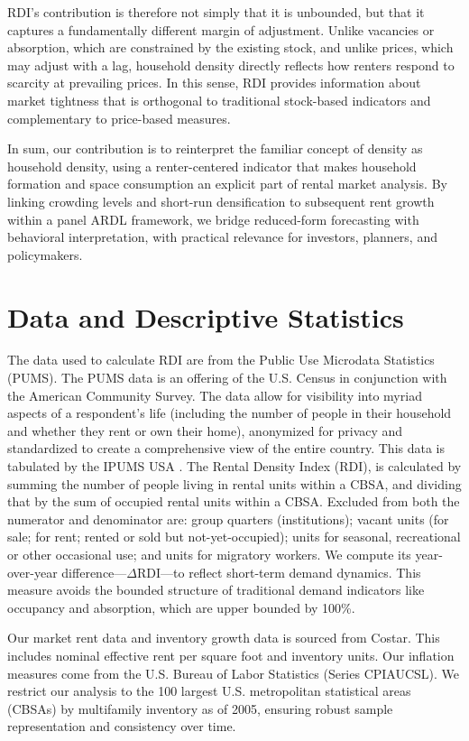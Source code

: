 \documentclass[pdflatex,sn-basic]{sn-jnl}%
\theoremstyle{thmstyleone}%
\theoremstyle{thmstyletwo}%
\theoremstyle{thmstylethree}%
\begin{document}
RDI's contribution is therefore not simply that it is unbounded, but that it captures a
fundamentally different margin of adjustment. Unlike vacancies or absorption, which
are constrained by the existing stock, and unlike prices, which may adjust with a lag,
household density directly reflects how renters respond to scarcity at prevailing prices.
In this sense, RDI provides information about market tightness that is orthogonal to
traditional stock-based indicators and complementary to price-based measures.

In sum, our contribution is to reinterpret the familiar concept of density as household
density, using a renter-centered indicator that makes household formation and space
consumption an explicit part of rental market analysis. By linking crowding levels and
short-run densification to subsequent rent growth within a panel ARDL framework, we
bridge reduced-form forecasting with behavioral interpretation, with practical relevance
for investors, planners, and policymakers.



\section{Data and Descriptive Statistics}\label{section3}
The data used to calculate RDI are from the Public Use Microdata Statistics (PUMS). The PUMS data is an offering of the U.S. Census in conjunction with the American Community Survey. The data allow for visibility into myriad aspects of a respondent's life (including the number of people in their household and whether they rent or own their home), anonymized for privacy and standardized to create a comprehensive view of the entire country. This data is tabulated by the IPUMS USA \cite{ruggles2025ipums}. The Rental Density Index (RDI), is calculated by summing the number of people living in rental units within a CBSA, and dividing that by the sum of occupied rental units within a CBSA. Excluded from both the numerator and denominator are: group quarters (institutions); vacant units (for sale; for rent; rented or sold but not-yet-occupied); units for seasonal, recreational or other occasional use; and units for migratory workers. We compute its year-over-year difference---\(\Delta\text{RDI}\)---to reflect short-term demand dynamics. This measure avoids the bounded structure of traditional demand indicators like occupancy and absorption, which are upper bounded by 100\%. 

Our market rent data and inventory growth data is sourced from Costar. This includes nominal effective rent per square foot and inventory units. Our inflation measures come from the U.S. Bureau of Labor Statistics (Series CPIAUCSL). We restrict our analysis to the 100 largest U.S. metropolitan statistical areas (CBSAs) by multifamily inventory as of 2005, ensuring robust sample representation and consistency over time.
\end{document}
